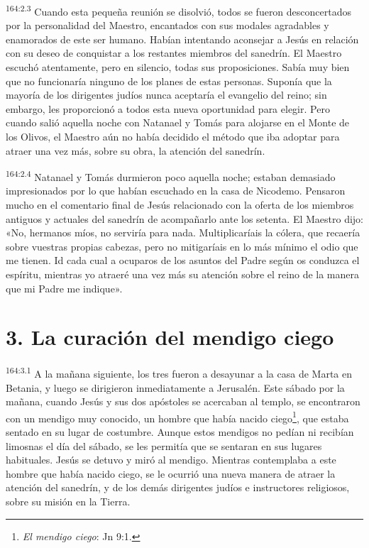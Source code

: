 \par
\textsuperscript{164:2.3} Cuando esta pequeña reunión se disolvió, todos se fueron desconcertados por la personalidad del Maestro, encantados con sus modales agradables y enamorados de este ser humano. Habían intentando aconsejar a Jesús en relación con su deseo de conquistar a los restantes miembros del sanedrín. El Maestro escuchó atentamente, pero en silencio, todas sus proposiciones. Sabía muy bien que no funcionaría ninguno de los planes de estas personas. Suponía que la mayoría de los dirigentes judíos nunca aceptaría el evangelio del reino; sin embargo, les proporcionó a todos esta nueva oportunidad para elegir. Pero cuando salió aquella noche con Natanael y Tomás para alojarse en el Monte de los Olivos, el Maestro aún no había decidido el método que iba adoptar para atraer una vez más, sobre su obra, la atención del sanedrín.

\par
\textsuperscript{164:2.4} Natanael y Tomás durmieron poco aquella noche; estaban demasiado impresionados por lo que habían escuchado en la casa de Nicodemo. Pensaron mucho en el comentario final de Jesús relacionado con la oferta de los miembros antiguos y actuales del sanedrín de acompañarlo ante los setenta. El Maestro dijo: «No, hermanos míos, no serviría para nada. Multiplicaríais la cólera, que recaería sobre vuestras propias cabezas, pero no mitigaríais en lo más mínimo el odio que me tienen. Id cada cual a ocuparos de los asuntos del Padre según os conduzca el espíritu, mientras yo atraeré una vez más su atención sobre el reino de la manera que mi Padre me indique».

\section*{3. La curación del mendigo ciego}
\par
\textsuperscript{164:3.1} A la mañana siguiente, los tres fueron a desayunar a la casa de Marta en Betania, y luego se dirigieron inmediatamente a Jerusalén. Este sábado por la mañana, cuando Jesús y sus dos apóstoles se acercaban al templo, se encontraron con un mendigo muy conocido, un hombre que había nacido ciego\footnote{\textit{El mendigo ciego}: Jn 9:1.}, que estaba sentado en su lugar de costumbre. Aunque estos mendigos no pedían ni recibían limosnas el día del sábado, se les permitía que se sentaran en sus lugares habituales. Jesús se detuvo y miró al mendigo. Mientras contemplaba a este hombre que había nacido ciego, se le ocurrió una nueva manera de atraer la atención del sanedrín, y de los demás dirigentes judíos e instructores religiosos, sobre su misión en la Tierra.

